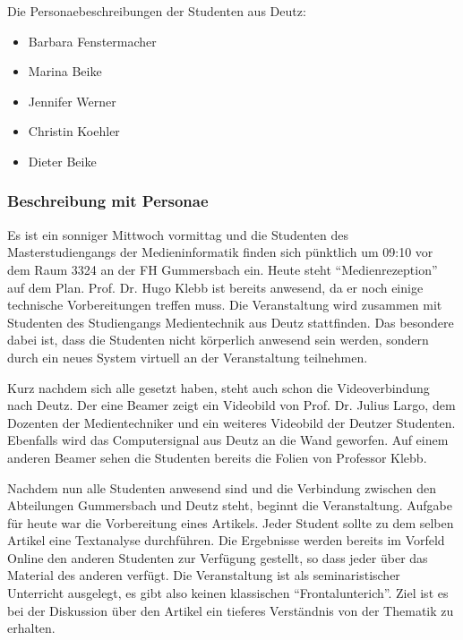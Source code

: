 Die Personaebeschreibungen der Studenten aus Deutz:

\begin{itemize}

	\item   Barbara Fenstermacher
	\item   Marina Beike
	\item   Jennifer Werner
	\item   Christin Koehler
	\item   Dieter Beike

\end{itemize}



\subsubsection{Beschreibung mit Personae} %
\label{ssub:beschreibung_mit_personae}

  Es ist ein sonniger Mittwoch vormittag und die Studenten des Masterstudiengangs der Medieninformatik finden sich pünktlich um 09:10 vor dem Raum 3324 an der FH Gummersbach ein. Heute steht "`Medienrezeption"' auf dem Plan. Prof. Dr. Hugo Klebb ist bereits anwesend, da er noch einige technische Vorbereitungen treffen muss. Die Veranstaltung wird zusammen mit Studenten des Studiengangs Medientechnik aus Deutz stattfinden. Das besondere dabei ist, dass die Studenten nicht körperlich anwesend sein werden, sondern durch ein neues System virtuell an der Veranstaltung teilnehmen.

  Kurz nachdem sich alle gesetzt haben, steht auch schon die Videoverbindung nach Deutz. Der eine Beamer zeigt ein Videobild von Prof. Dr. Julius Largo, dem Dozenten der Medientechniker und ein weiteres Videobild der Deutzer Studenten. Ebenfalls wird das Computersignal aus Deutz an die Wand geworfen. Auf einem anderen Beamer sehen die Studenten bereits die Folien von Professor Klebb.

  Nachdem nun alle Studenten anwesend sind und die Verbindung zwischen den Abteilungen Gummersbach und Deutz steht, beginnt die Veranstaltung. Aufgabe für heute war die Vorbereitung eines Artikels. Jeder Student sollte zu dem selben Artikel eine Textanalyse durchführen. Die Ergebnisse werden bereits im Vorfeld Online den anderen Studenten zur Verfügung gestellt, so dass jeder über das Material des anderen verfügt. Die Veranstaltung ist als seminaristischer Unterricht ausgelegt, es gibt also keinen klassischen "`Frontalunterich"'. Ziel ist es bei der Diskussion über den Artikel ein tieferes Verständnis von der Thematik zu erhalten.

